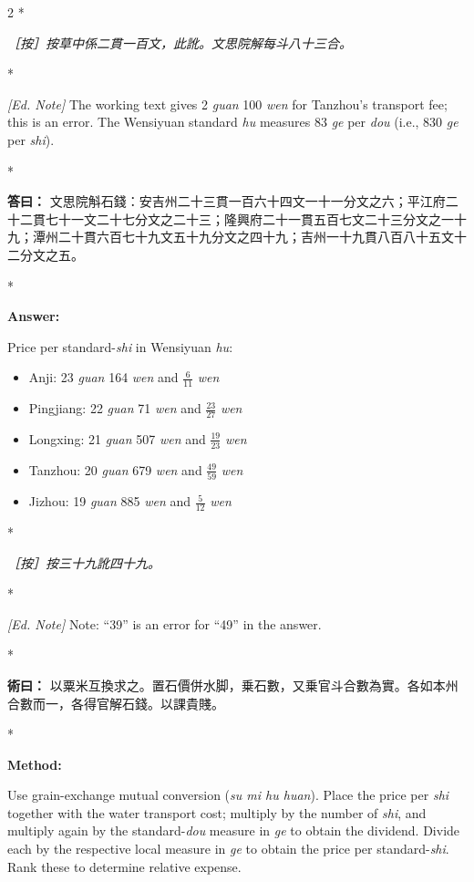 \documentclass[11pt,a4paper]{article}
\newcommand{\CnAnswer}[1]{\par\noindent\textbf{\color{answercolor}答曰：}#1\par\vspace{0.5ex}}
\newcommand{\CnMethod}[1]{\par\noindent\textbf{\color{methodcolor}術曰：}#1\par\vspace{0.5ex}}
\newcommand{\CnEditorial}[1]{\par\noindent\textcolor{editorialcolor}{\textit{［按］#1}}\par\vspace{0.5ex}}
\newcommand{\EnAnswer}{\par\noindent\textbf{\color{answercolor}Answer:}\par\vspace{0.5ex}}
\newcommand{\EnMethod}{\par\noindent\textbf{\color{methodcolor}Method:}\par\vspace{0.5ex}}
\newcommand{\EnEditorial}{\par\noindent\textcolor{editorialcolor}{\textit{[Ed. Note] }}\ignorespaces}
\newcommand{\switchCn}{\switchcolumn[0]*}
\newcommand{\switchEn}{\switchcolumn[1]*}
\begin{document}
\begin{paracol}{2}
\switchCn

\CnEditorial{按草中係二貫一百文，此訛。文思院解每斗八十三合。}

\switchEn

\EnEditorial The working text gives 2 \textit{guan} 100 \textit{wen} for Tanzhou's transport fee; this is an error. The Wensiyuan standard \textit{hu} measures 83 \textit{ge} per \textit{dou} (i.e., 830 \textit{ge} per \textit{shi}).

\switchCn

\CnAnswer{%
文思院斛石錢：安吉州二十三貫一百六十四文一十一分文之六；平江府二十二貫七十一文二十七分文之二十三；隆興府二十一貫五百七文二十三分文之一十九；潭州二十貫六百七十九文五十九分文之四十九；吉州一十九貫八百八十五文十二分文之五。
}

\switchEn

\EnAnswer
Price per standard-\textit{shi} in Wensiyuan \textit{hu}:
\begin{itemize}[leftmargin=1em,itemsep=0.2ex]
\item Anji: 23 \textit{guan} 164 \textit{wen} and $\frac{6}{11}$ \textit{wen}
\item Pingjiang: 22 \textit{guan} 71 \textit{wen} and $\frac{23}{27}$ \textit{wen}
\item Longxing: 21 \textit{guan} 507 \textit{wen} and $\frac{19}{23}$ \textit{wen}
\item Tanzhou: 20 \textit{guan} 679 \textit{wen} and $\frac{49}{59}$ \textit{wen}
\item Jizhou: 19 \textit{guan} 885 \textit{wen} and $\frac{5}{12}$ \textit{wen}
\end{itemize}

\switchCn

\CnEditorial{按三十九訛四十九。}

\switchEn

\EnEditorial Note: ``39'' is an error for ``49'' in the answer.

\switchCn

\CnMethod{%
以粟米互換求之。置石價併水脚，乗石數，又乗官斗合數為實。各如本州合數而一，各得官解石錢。以課貴賤。
}

\switchEn

\EnMethod
Use grain-exchange mutual conversion (\textit{su mi hu huan}). Place the price per \textit{shi} together with the water transport cost; multiply by the number of \textit{shi}, and multiply again by the standard-\textit{dou} measure in \textit{ge} to obtain the dividend. Divide each by the respective local measure in \textit{ge} to obtain the price per standard-\textit{shi}. Rank these to determine relative expense.


\end{paracol}
\end{document}
